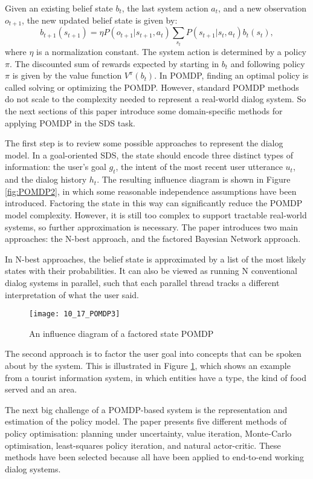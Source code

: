 Given an existing belief state $b_t$, the last system action $a_t$, and a new observation $o_{t+1}$, the new updated belief state is given by:
$$b_{t+1}(s_{t+1}) = \eta P(o_{t+1} | s_{t+1}, a_t) \sum_{s_t} P(s_{t+1} | s_t, a_t)  b_t(s_t),$$
where $\eta$ is a normalization constant. The system action is determined by a policy $\pi$. The discounted sum of rewards expected by starting in $b_t$ and following policy $\pi$ is given by the value function $V^\pi(b_t)$. In POMDP, finding an optimal policy is called solving or optimizing the POMDP. However, standard POMDP methods do not scale to the complexity needed to represent a real-world dialog system. So the next sections of this paper introduce some domain-specific methods for applying POMDP in the SDS task.

The first step is to review some possible approaches to represent the dialog model. In a goal-oriented SDS, the state should encode three distinct types of information: the user's goal $g_t$, the intent of the most recent user utterance $u_t$, and the dialog history $h_t$. The resulting influence diagram is shown in Figure \ref{fig:POMDP2}, in which some reasonable independence assumptions have been introduced. Factoring the state in this way can significantly reduce the POMDP model complexity. However, it is still too complex to support tractable real-world systems, so further approximation is necessary. The paper introduces two main approaches: the N-best approach, and the factored Bayesian Network approach.

In N-best approaches, the belief state is approximated by a list of the most likely states with their probabilities. It can also be viewed as running N conventional dialog systems in parallel, such that each parallel thread tracks a different interpretation of what the user said.

\begin{figure}[htbp]
  \centering
  \texttt{[image: 10\_17\_POMDP3]}\\
  \caption{An influence diagram of a factored state POMDP}\label{fig:POMDP3}
\end{figure}

The second approach is to factor the user goal into concepts that can be spoken about by the system. This is illustrated in Figure \ref{fig:POMDP3}, which shows an example from a tourist information system, in which entities have a type, the kind of food served and an area.

The next big challenge of a POMDP-based system is the representation and estimation of the policy model. The paper presents five different methods of policy optimisation: planning under uncertainty, value iteration, Monte-Carlo optimisation, least-squares policy iteration, and natural actor-critic. These methods have been selected because all have been applied to end-to-end working dialog systems.

